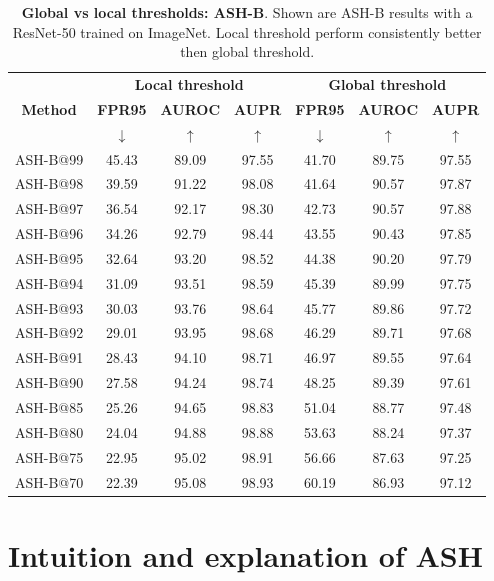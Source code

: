 \documentclass{article}
\newcommand{\seclabel}[1]{\label{sec:#1}}
\newcommand{\tablabel}[1]{\label{tab:#1}}
\begin{document}
\begin{table}[hbt!]
\centering
\begin{tabular}{c c c c | c c c}
        \hline
         & \multicolumn{3}{c}{\textbf{Local threshold}} & \multicolumn{3}{c}{\textbf{Global threshold}} \\
        \textbf{Method} & \textbf{FPR95} & \textbf{AUROC} & \textbf{AUPR} & \textbf{FPR95} & \textbf{AUROC} & \textbf{AUPR} \\
         & $\downarrow$ & $\uparrow$ & \multicolumn{1}{c}{$\uparrow$} & $\downarrow$ & $\uparrow$ & \multicolumn{1}{c}{$\uparrow$} \\
        \midrule
        ASH-B@99 & 45.43 & 89.09 & 97.55 & 41.70 & 89.75 & 97.55 \\
        ASH-B@98 & 39.59 & 91.22 & 98.08 & 41.64 & 90.57 & 97.87 \\
        ASH-B@97 & 36.54 & 92.17 & 98.30 & 42.73 & 90.57 & 97.88 \\
        ASH-B@96 & 34.26 & 92.79 & 98.44 & 43.55 & 90.43 & 97.85 \\
        ASH-B@95 & 32.64 & 93.20 & 98.52 & 44.38 & 90.20 & 97.79 \\
        ASH-B@94 & 31.09 & 93.51 & 98.59 & 45.39 & 89.99 & 97.75 \\
        ASH-B@93 & 30.03 & 93.76 & 98.64 & 45.77 & 89.86 & 97.72 \\
        ASH-B@92 & 29.01 & 93.95 & 98.68 & 46.29 & 89.71 & 97.68 \\
        ASH-B@91 & 28.43 & 94.10 & 98.71 & 46.97 & 89.55 & 97.64 \\
        ASH-B@90 & 27.58 & 94.24 & 98.74 & 48.25 & 89.39 & 97.61 \\
        ASH-B@85 & 25.26 & 94.65 & 98.83 & 51.04 & 88.77 & 97.48 \\
        ASH-B@80 & 24.04 & 94.88 & 98.88 & 53.63 & 88.24 & 97.37 \\
        ASH-B@75 & 22.95 & 95.02 & 98.91 & 56.66 & 87.63 & 97.25 \\
        ASH-B@70 & 22.39 & 95.08 & 98.93 & 60.19 & 86.93 & 97.12 \\
        \midrule
    \end{tabular}
\caption{\textbf{Global vs local thresholds: ASH-B}. Shown are ASH-B results with a ResNet-50 trained on ImageNet. Local threshold perform consistently better then global threshold.}
    \tablabel{appendix_global_vs_local}
\end{table}

\section{Intuition and explanation of ASH}
\seclabel{additional_disc}
\end{document}
